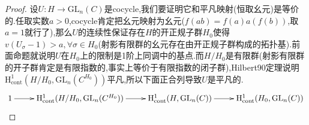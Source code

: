 \begin{enumerate}
\begin{proof}
		设$U:H\to\mathrm{GL}_n(C)$是cocycle,我们要证明它和平凡映射(恒取幺元)是等价的.任取实数$a>0$,cocycle肯定把幺元映射为幺元($f(ab)=f(a)a(f(b))$,取$a=1$就行了),那么$U$的连续性保证存在$H$的开正规子群$H_0$使得$v(U_{\sigma}-1)>a,\forall\sigma\in H_0$(射影有限群的幺元存在由开正规子群构成的拓扑基).前面命题就说明$U$在$H_0$上的限制是1阶上同调中的基点.而$H/H_0$是有限群(射影有限群的开子群肯定是有限指数的,事实上等价于有限指数的闭子群),Hilbert90定理说明$\mathrm{H}^1_{\mathrm{cont}}(H/H_0,\mathrm{GL}_n(C^{H_0}))$平凡,所以下面正合列导致$U$是平凡的.
		$$\xymatrix{1\ar[r]&\mathrm{H}^1_{\mathrm{cont}}(H/H_0,\mathrm{GL}_n(C^{H_0}))\ar[r]&\mathrm{H}^1_{\mathrm{cont}}(H,\mathrm{GL}_n(C))\ar[r]&\mathrm{H}^1_{\mathrm{cont}}(H_0,\mathrm{GL}_n(C))}$$
	\end{proof}
\end{enumerate}




